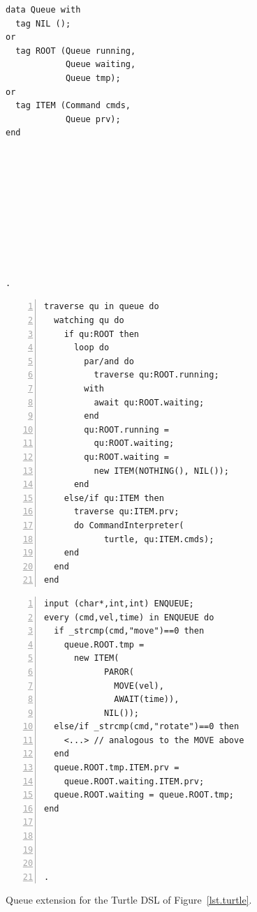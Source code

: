 \documentclass{sig-alternate}
\newcommand{\code}[1] {{\small{\texttt{#1}}}}
\begin{document}
\begin{figure}[t]
\begin{minipage}[t]{0.22\linewidth}
\begin{lstlisting}[title=CODE-3: \code{Queue} type]
data Queue with
  tag NIL ();
or
  tag ROOT (Queue running,
            Queue waiting,
            Queue tmp);
or
  tag ITEM (Command cmds,
            Queue prv);
end










.
\end{lstlisting}
\end{minipage}
%
\begin{minipage}[t]{0.36\linewidth}
\begin{lstlisting}[numbers=left,xleftmargin=3.5em,title=CODE-4: Queue traversal]
traverse qu in queue do
  watching qu do
    if qu:ROOT then
      loop do
        par/and do
          traverse qu:ROOT.running;
        with
          await qu:ROOT.waiting;
        end
        qu:ROOT.running =
          qu:ROOT.waiting;
        qu:ROOT.waiting =
          new ITEM(NOTHING(), NIL());
      end
    else/if qu:ITEM then
      traverse qu:ITEM.prv;
      do CommandInterpreter(
            turtle, qu:ITEM.cmds);
    end
  end
end
\end{lstlisting}
\end{minipage}
%
\begin{minipage}[t]{0.39\linewidth}
\begin{lstlisting}[numbers=left,xleftmargin=3.5em,title=CODE-5: Enqueuing commands]
input (char*,int,int) ENQUEUE;
every (cmd,vel,time) in ENQUEUE do
  if _strcmp(cmd,"move")==0 then
    queue.ROOT.tmp =
      new ITEM(
            PAROR(
              MOVE(vel),
              AWAIT(time)),
            NIL());
  else/if _strcmp(cmd,"rotate")==0 then
    <...> // analogous to the MOVE above
  end
  queue.ROOT.tmp.ITEM.prv =
    queue.ROOT.waiting.ITEM.prv;
  queue.ROOT.waiting = queue.ROOT.tmp;
end




.
\end{lstlisting}
\end{minipage}
%
\caption{ Queue extension for the Turtle DSL of
          Figure~\ref{lst.turtle}.
\label{lst.turtle.queue}
}
\end{figure}
\end{document}
